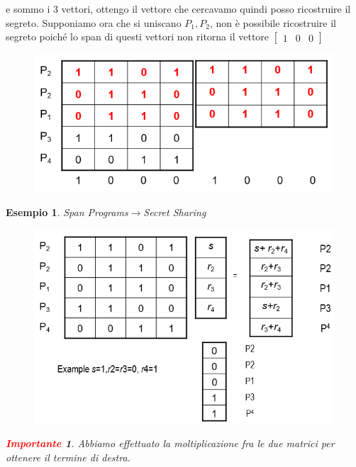 \documentclass{book}
\newtheorem*{Importante}{\textbf{\textcolor{red}{Importante}}}
\newtheorem{esempio}{\textcolor{Grey1}{Esempio}}
\begin{document}
e sommo i 3 vettori, ottengo il vettore che cercavamo quindi posso ricostruire il segreto\@.\newline
Supponiamo ora che si uniscano \(P_{1},P_{2}\), non è possibile ricostruire il segreto poiché lo span di questi vettori non ritorna il vettore \(\begin{bmatrix}
    1&0&0
\end{bmatrix}\)
\begin{figure}[h]
    \centering
    \includegraphics[scale=0.4]{2022-01-08-16-38-44.png}%
\end{figure}
\newpage
\begin{esempio}
    Span Programs\(\rightarrow \)Secret Sharing
    \begin{figure}[h]
        \centering
        \includegraphics[scale=0.4]{2022-01-08-17-18-40.png}%
    \end{figure}
    \begin{Importante}
        Abbiamo effettuato la moltiplicazione fra le due matrici per ottenere il termine di destra.
    \end{Importante}
\end{esempio}
\end{document}
